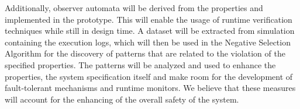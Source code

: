 Additionally, observer automata will be derived from the properties and implemented in the prototype. This will enable the usage of runtime verification techniques while still in design time. A dataset will be extracted from simulation containing the execution logs, which will then be used in the Negative Selection Algorithm \cite{NSAResearch2021} for the discovery of patterns that are related to the violation of the specified properties. The patterns will be analyzed and used to enhance the properties, the system specification itself and make room for the development of fault-tolerant mechanisms and runtime monitors. We believe that these measures will account for the enhancing of the overall safety of the system.





